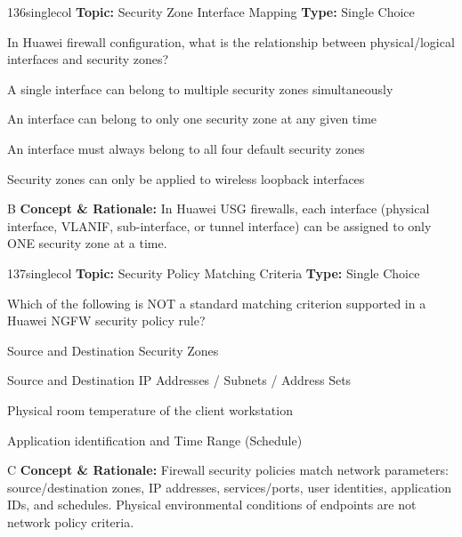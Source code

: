 \begin{qcard}{136}{singlecol}
\textcolor{darkslate!75}{\small\textbf{Topic:} Security Zone Interface Mapping \hfill \textbf{Type:} Single Choice}\vspace{0.4em}\par
In Huawei firewall configuration, what is the relationship between physical/logical interfaces and security zones?
\begin{qoptions}
\item A single interface can belong to multiple security zones simultaneously
\item An interface can belong to only one security zone at any given time
\item An interface must always belong to all four default security zones
\item Security zones can only be applied to wireless loopback interfaces
\end{qoptions}
\end{qcard}
\nopagebreak
\begin{explainbox}{B}
\textbf{Concept \& Rationale:} In Huawei USG firewalls, each interface (physical interface, VLANIF, sub-interface, or tunnel interface) can be assigned to only ONE security zone at a time.
\end{explainbox}

\begin{qcard}{137}{singlecol}
\textcolor{darkslate!75}{\small\textbf{Topic:} Security Policy Matching Criteria \hfill \textbf{Type:} Single Choice}\vspace{0.4em}\par
Which of the following is NOT a standard matching criterion supported in a Huawei NGFW security policy rule?
\begin{qoptions}
\item Source and Destination Security Zones
\item Source and Destination IP Addresses / Subnets / Address Sets
\item Physical room temperature of the client workstation
\item Application identification and Time Range (Schedule)
\end{qoptions}
\end{qcard}
\nopagebreak
\begin{explainbox}{C}
\textbf{Concept \& Rationale:} Firewall security policies match network parameters: source/destination zones, IP addresses, services/ports, user identities, application IDs, and schedules. Physical environmental conditions of endpoints are not network policy criteria.
\end{explainbox}

